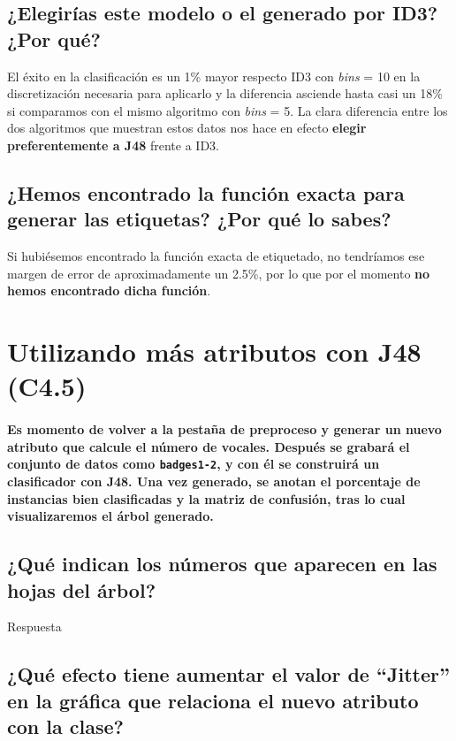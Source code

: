 \documentclass[12pt]{article}
\begin{document}
\subsection*{\small ¿Elegirías este modelo o el generado por ID3? ¿Por qué?}

El éxito en la clasificación es un 1\% mayor respecto ID3 con \emph{bins} = 10
en la discretización necesaria para aplicarlo y la diferencia asciende hasta
casi un 18\% si comparamos con el mismo algoritmo con \emph{bins} = 5. La clara
diferencia entre los dos algoritmos que muestran estos datos nos hace en efecto
\textbf{elegir preferentemente a J48} frente a ID3.

\subsection*{\small ¿Hemos encontrado la función exacta para generar las
etiquetas? ¿Por qué lo sabes?}

Si hubiésemos encontrado la función exacta de etiquetado, no tendríamos ese
margen de error de aproximadamente un 2.5\%, por lo que por el momento
\textbf{no hemos encontrado dicha función}.

\newpage

\section{Utilizando más atributos con J48 (C4.5)}

\paragraph{\small Es momento de volver a la pestaña de preproceso y generar un
nuevo atributo que calcule el número de vocales. Después se grabará el conjunto
de datos como \texttt{badges1-2}, y con él se construirá un clasificador
con J48. Una vez generado, se anotan el porcentaje de instancias bien
clasificadas y la matriz de confusión, tras lo cual visualizaremos el árbol
generado.}

\subsection*{\small ¿Qué indican los números que aparecen en las hojas del
árbol?}

Respuesta

\subsection*{\small ¿Qué efecto tiene aumentar el valor de ``Jitter'' en la
gráfica que relaciona el nuevo atributo con la clase?}
\end{document}
